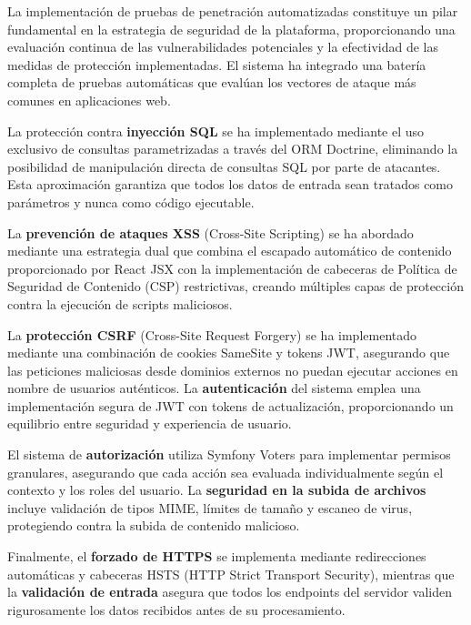 \documentclass[12pt,a4paper,oneside]{report}
\begin{document}
La implementación de pruebas de penetración automatizadas constituye un pilar fundamental en la estrategia de seguridad de la plataforma, proporcionando una evaluación continua de las vulnerabilidades potenciales y la efectividad de las medidas de protección implementadas. El sistema ha integrado una batería completa de pruebas automáticas que evalúan los vectores de ataque más comunes en aplicaciones web.

La protección contra \textbf{inyección SQL} se ha implementado mediante el uso exclusivo de consultas parametrizadas a través del ORM Doctrine, eliminando la posibilidad de manipulación directa de consultas SQL por parte de atacantes. Esta aproximación garantiza que todos los datos de entrada sean tratados como parámetros y nunca como código ejecutable.

La \textbf{prevención de ataques XSS} (Cross-Site Scripting) se ha abordado mediante una estrategia dual que combina el escapado automático de contenido proporcionado por React JSX con la implementación de cabeceras de Política de Seguridad de Contenido (CSP) restrictivas, creando múltiples capas de protección contra la ejecución de scripts maliciosos.

La \textbf{protección CSRF} (Cross-Site Request Forgery) se ha implementado mediante una combinación de cookies SameSite y tokens JWT, asegurando que las peticiones maliciosas desde dominios externos no puedan ejecutar acciones en nombre de usuarios auténticos. La \textbf{autenticación} del sistema emplea una implementación segura de JWT con tokens de actualización, proporcionando un equilibrio entre seguridad y experiencia de usuario.

El sistema de \textbf{autorización} utiliza Symfony Voters para implementar permisos granulares, asegurando que cada acción sea evaluada individualmente según el contexto y los roles del usuario. La \textbf{seguridad en la subida de archivos} incluye validación de tipos MIME, límites de tamaño y escaneo de virus, protegiendo contra la subida de contenido malicioso.

Finalmente, el \textbf{forzado de HTTPS} se implementa mediante redirecciones automáticas y cabeceras HSTS (HTTP Strict Transport Security), mientras que la \textbf{validación de entrada} asegura que todos los endpoints del servidor validen rigurosamente los datos recibidos antes de su procesamiento.
\end{document}
